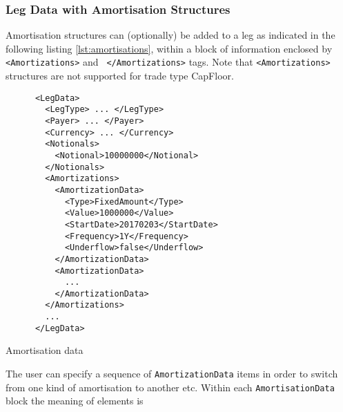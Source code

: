 \subsubsection{Leg Data with Amortisation Structures}
\label{ss:amortisationdata}

Amortisation structures can (optionally) be added to a leg as
indicated in the following listing \ref{lst:amortisations}, within a
block of information enclosed by {\tt <Amortizations>} and {\tt
  </Amortizations>} tags. Note that {\tt <Amortizations>}  structures are 
  not supported for trade type CapFloor.

\begin{listing}[H]
\begin{verbatim}
      <LegData>
        <LegType> ... </LegType>
        <Payer> ... </Payer>
        <Currency> ... </Currency>
        <Notionals>
          <Notional>10000000</Notional>
        </Notionals>
        <Amortizations>
          <AmortizationData>
            <Type>FixedAmount</Type>
            <Value>1000000</Value>
            <StartDate>20170203</StartDate>
            <Frequency>1Y</Frequency>
            <Underflow>false</Underflow>
          </AmortizationData>
          <AmortizationData>
            ...
          </AmortizationData>
        </Amortizations>
        ...
      </LegData>
\end{verbatim}
\caption{Amortisation data}
\label{lst:amortisations}
\end{listing}

The user can specify a sequence of {\tt AmortizationData} items in
order to switch from one kind of amortisation to another etc.  
Within each {\tt AmortisationData} block the meaning of elements is

